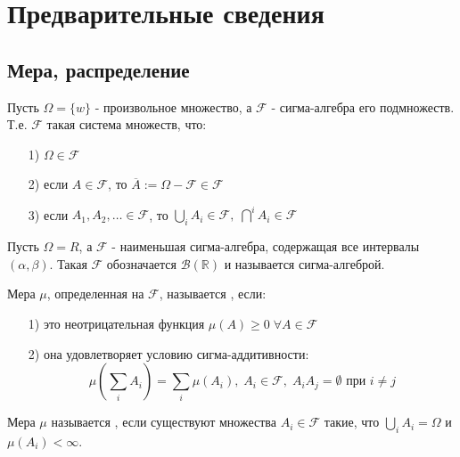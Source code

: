 \chapter{Предварительные сведения}\label{cha:1}

\section{Мера, распределение}\label{cha:1/sec:1}

Пусть $\Omega = \{ w\}$ - произвольное множество, а $\mathcal{F}$ - сигма-алгебра его подмножеств. Т.е. $\mathcal{F}$ такая система множеств, что:
\begin{itemize}
	\item[1)] $\Omega \in \mathcal{F}$
	\item[2)] если $A \in \mathcal{F}$, то $\overline{A} := \Omega - \mathcal{F} \in \mathcal{F}$
	\item[3)] если $A_1, A_2, \dots \in \mathcal{F}$, то $\underset{i}{\bigcup}A_i \in \mathcal{F}, \; \overset{i}{\bigcap}A_i \in \mathcal{F}$
\end{itemize}

\begin{definition}\label{cha:1/def:1}
	Пусть $\Omega = R$, а $\mathcal{F}$ - наименьшая сигма-алгебра, содержащая все интервалы $(\alpha, \beta)$. Такая $\mathcal{F}$ обозначается $\mathcal{B}(\mathbb{R})$ и называется  сигма-алгеброй.
\end{definition}

\begin{definition}\label{cha:1/def:2}
	Мера $\mu$, определенная на $\mathcal{F}$, называется , если:
	\begin{itemize}
		\item[1)] 
			это неотрицательная функция $\displaystyle \mu (A) \ge 0 \; \forall A \in \mathcal{F}$
		\item[2)] 
			она удовлетворяет условию сигма-аддитивности: $$\displaystyle \mu (\underset{i}{\overset{}{\sum}}A_i) = \underset{i}{\overset{}{\sum}}\mu(A_i), \; A_i \in \mathcal{F}, \; A_i A_j = \emptyset \text{ при } i \not = j$$
	\end{itemize}
\end{definition}

\begin{definition}\label{cha:1/def:3}
	Мера $\mu$ называется , если существуют множества $A_i \in \mathcal{F}$ такие, что $\underset{i}{\bigcup}A_i = \Omega$ и $\mu(A_i) < \infty$.
\end{definition}

